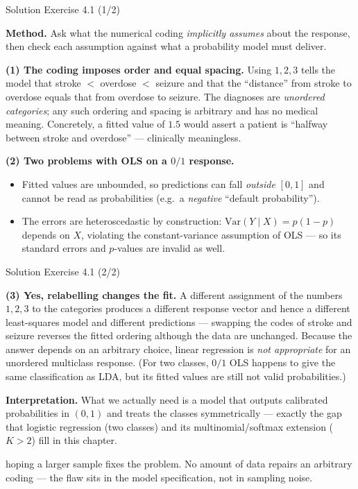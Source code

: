 \documentclass[aspectratio=169,11pt]{beamer}
\begin{document}
\begin{frame}{Solution \textemdash{} Exercise 4.1 (1/2)}
\begin{solutionbox}
\textbf{Method.} Ask what the numerical coding \emph{implicitly assumes}
about the response, then check each assumption against what a
probability model must deliver.

\vspace{1mm}
\textbf{(1) The coding imposes order and equal spacing.}
Using $1,2,3$ tells the model that stroke $<$ overdose $<$ seizure and
that the ``distance'' from stroke to overdose equals that from overdose
to seizure. The diagnoses are \emph{unordered categories}; any such
ordering and spacing is arbitrary and has no medical meaning.
Concretely, a fitted value of $1.5$ would assert a patient is
``halfway between stroke and overdose'' --- clinically meaningless.

\vspace{1mm}
\textbf{(2) Two problems with OLS on a $0/1$ response.}
\begin{itemize}
  \item Fitted values are unbounded, so predictions can fall
        \emph{outside} $[0,1]$ and cannot be read as probabilities
        (e.g.\ a \emph{negative} ``default probability'').
  \item The errors are heteroscedastic by construction:
        $\mathrm{Var}(Y\mid X)=p(1-p)$ depends on $X$, violating the
        constant-variance assumption of OLS --- so its standard errors
        and $p$-values are invalid as well.
\end{itemize}
\end{solutionbox}
\end{frame}

\begin{frame}{Solution \textemdash{} Exercise 4.1 (2/2)}
\begin{solutionbox}
\textbf{(3) Yes, relabelling changes the fit.}
A different assignment of the numbers $1,2,3$ to the categories produces
a different response vector and hence a different least-squares model
and different predictions --- swapping the codes of stroke and seizure
reverses the fitted ordering although the data are unchanged. Because
the answer depends on an arbitrary
choice, linear regression is \emph{not appropriate} for an unordered
multiclass response. (For two classes, $0/1$ OLS happens to give the
same classification as LDA, but its fitted values are still not valid
probabilities.)

\vspace{1mm}
\textbf{Interpretation.} What we actually need is a model that outputs
calibrated probabilities in $(0,1)$ and treats the classes
symmetrically --- exactly the gap that logistic regression (two
classes) and its multinomial/softmax extension ($K>2$) fill in this
chapter.
\end{solutionbox}
\begin{mistake}
hoping a larger sample fixes the problem. No
amount of data repairs an arbitrary coding --- the flaw sits in the
model specification, not in sampling noise.
\end{mistake}
\end{frame}
\end{document}
